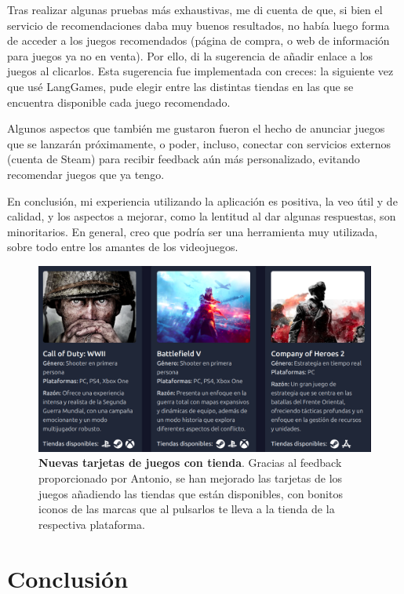 Tras realizar algunas pruebas más exhaustivas, me di cuenta de que, si bien el servicio de recomendaciones daba muy buenos resultados, no había luego forma de acceder a los juegos recomendados (página de compra, o web de información para juegos ya no en venta). Por ello, di la sugerencia de añadir enlace a los juegos al clicarlos. Esta sugerencia fue implementada con creces: la siguiente vez que usé LangGames, pude elegir entre las distintas tiendas en las que se encuentra disponible cada juego recomendado.

Algunos aspectos que también me gustaron fueron el hecho de anunciar juegos que se lanzarán próximamente, o poder, incluso, conectar con servicios externos (cuenta de Steam) para recibir feedback aún más personalizado, evitando recomendar juegos que ya tengo.

En conclusión, mi experiencia utilizando la aplicación es positiva, la veo útil y de calidad, y los aspectos a mejorar, como la lentitud al dar algunas respuestas, son minoritarios. En general, creo que podría ser una herramienta muy utilizada, sobre todo entre los amantes  de los videojuegos.


\begin{figure}[H]
	\centering
	\includegraphics[width=1\linewidth]{imagenes/tarjetasConTiendas.png}
	\caption[\textbf{Nuevas tarjetas de juegos con tienda}.]{\textbf{Nuevas tarjetas de juegos con tienda}. Gracias al feedback proporcionado por Antonio, se han mejorado las tarjetas de los juegos añadiendo las tiendas que están disponibles, con bonitos iconos de las marcas que al pulsarlos te lleva a la tienda de la respectiva plataforma.}
	\label{tarjetas-con-tienda}
\end{figure}

\newpage

\section{Conclusión}

